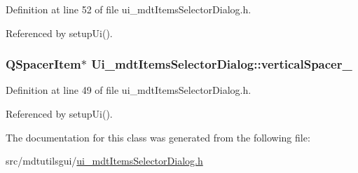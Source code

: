 Definition at line 52 of file ui\-\_\-mdt\-Items\-Selector\-Dialog.\-h.



Referenced by setup\-Ui().

\hypertarget{class_ui__mdt_items_selector_dialog_aefaca5b3d54784c1a3873b5cb5cc958f}{
\subsubsection[{vertical\-Spacer\-\_\-2}]{\setlength{\rightskip}{0pt plus 5cm}Q\-Spacer\-Item$\ast$ Ui\-\_\-mdt\-Items\-Selector\-Dialog\-::vertical\-Spacer\-\_}}\label{class_ui__mdt_items_selector_dialog_aefaca5b3d54784c1a3873b5cb5cc958f}


Definition at line 49 of file ui\-\_\-mdt\-Items\-Selector\-Dialog.\-h.



Referenced by setup\-Ui().



The documentation for this class was generated from the following file\-:\begin{DoxyCompactItemize}
\item 
src/mdtutilsgui/\hyperlink{ui__mdt_items_selector_dialog_8h}{ui\-\_\-mdt\-Items\-Selector\-Dialog.\-h}\end{DoxyCompactItemize}
